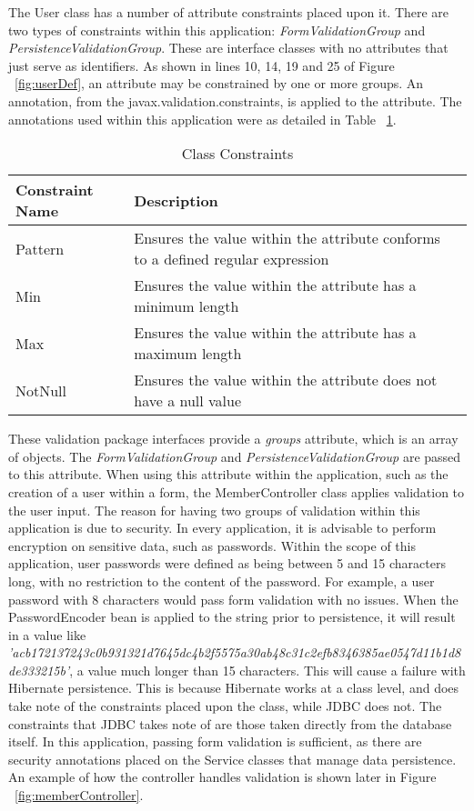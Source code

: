 The User class has a number of attribute constraints placed upon it. There are two types of constraints within this application: \textit{FormValidationGroup} and \textit{PersistenceValidationGroup}. These are interface classes with no attributes that just serve as identifiers. As shown in lines 10, 14, 19 and 25 of Figure ~\ref{fig:userDef}, an attribute may be constrained by one or more groups. An annotation, from the javax.validation.constraints, is applied to the attribute. The annotations used within this application were as detailed in Table ~\ref{fig:classConstraints}.

\begin{table}[H]
\begin{center}
    \begin{tabular}{ | l | l | p{5cm} |}
    \hline
    Constraint Name & Description\\ \hline
    Pattern & Ensures the value within the attribute conforms to a defined regular expression\\ \hline
    Min & Ensures the value within the attribute has a minimum length\\ \hline
	Max & Ensures the value within the attribute has a maximum length\\ \hline
	NotNull & Ensures the value within the attribute does not have a null value\\ \hline
    \end{tabular}
\end{center}
\caption{Class Constraints}
\label{fig:classConstraints}
\end{table}

These validation package interfaces provide a \textit{groups} attribute, which is an array of objects. The \textit{FormValidationGroup} and \textit{PersistenceValidationGroup} are passed to this attribute. When using this attribute within the application, such as the creation of a user within a form, the MemberController class applies validation to the user input. The reason for having two groups of validation within this application is due to security. In every application, it is advisable to perform encryption on sensitive data, such as passwords. Within the scope of this application, user passwords were defined as being between 5 and 15 characters long, with no restriction to the content of the password. For example, a user password with 8 characters would pass form validation with no issues. When the PasswordEncoder bean is applied to the string prior to persistence, it will result in a value like \textit{'acb172137243c0b931321d7645dc4b2f5575a30ab48c31c2efb8346385ae0547d11b1d8de333215b'}, a value much longer than 15 characters. This will cause a failure with Hibernate persistence. This is because Hibernate works at a class level, and does take note of the constraints placed upon the class, while JDBC does not. The constraints that JDBC takes note of are those taken directly from the database itself. In this application, passing form validation is sufficient, as there are security annotations placed on the Service classes that manage data persistence. An example of how the controller handles validation is shown later in Figure ~\ref{fig:memberController}. 

